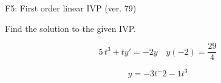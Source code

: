 \begin{exercise}
  \begin{exerciseTitle}F5: First order linear IVP (ver. 79)\end{exerciseTitle}
  \begin{exerciseStatement}
    
Find the solution to the given IVP.

    
\[5 \, t^{3} +ty'= -2 y \hspace{1em} y( -2 ) = \frac{29}{4}\]

  \end{exerciseStatement}
  \begin{exerciseAnswer}
    
\[y= -3 t^ -2 -1 t^{3}\]

  \end{exerciseAnswer}
\end{exercise}